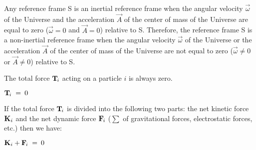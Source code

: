 \documentclass[10pt]{article}
\begin{document}
\par \bigskip \noindent Any reference frame S is an inertial reference frame when the angular velocity ${\vec{\omega}}$ of the Universe and the acceleration ${\vec{\mathit{A}}}$ of the center of mass of the Universe are equal to zero (\:${\vec{\omega}}=0$ {\hspace{+0.06em}\small and\hspace{+0.06em}} ${\vec{\mathit{A}}}=0$\:) relative to S. Therefore, the reference frame S is a non-inertial reference frame when the angular velocity ${\vec{\omega}}$ of the Universe or the acceleration ${\vec{\mathit{A}}}$ of the center of mass of the Universe are not equal to zero (\:${\vec{\omega}}\ne 0$ {\hspace{+0.06em}\small or\hspace{+0.06em}} ${\vec{\mathit{A}}}\ne 0$\:) relative to S.

\newpage

\par {}

\par \bigskip \noindent The total force ${\mathbf{T}}_{\hspace{-0.09em}i}$ acting on a particle $i$ is always zero.

\par \bigskip ${\mathbf{T}}_{\hspace{-0.09em}i} \;=\: \mathrm{0}$

\par \bigskip \noindent If the total force ${\mathbf{T}}_{\hspace{-0.09em}i}$ is divided into the following two parts: the net kinetic force ${\mathbf{K}}_{\hspace{+0.009em}i}$ and the net dynamic force ${\mathbf{F}}_{\hspace{-0.09em}i}$ (\hspace{+0.060em}$\sum$ of gravitational forces, electrostatic forces, etc.\hspace{+0.060em}) then we have:

\par \bigskip ${\mathbf{K}}_{\hspace{+0.009em}i} + {\mathbf{F}}_{\hspace{-0.09em}i} \;=\: \mathrm{0}$
\end{document}
